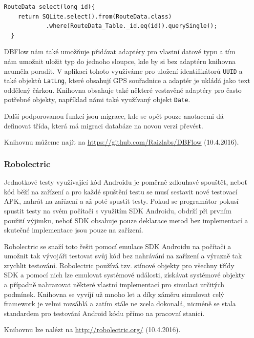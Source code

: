 \documentclass[czech,master,public,dept460,male,java,cpdeclaration]{diploma}
\begin{document}
\begin{lstlisting}[label=dbflowquery,caption=Sestavování SQL dotazů s DBFlow]
  RouteData select(long id){
    return SQLite.select().from(RouteData.class)
            .where(RouteData_Table._id.eq(id)).querySingle();
  }
\end{lstlisting}

  DBFlow nám také umožňuje přidávat adaptéry pro vlastní datové typu a tím nám umožnit uložit
  typ do jednoho sloupce, kde by si bez adaptéru knihovna neuměla poradit. V aplikaci
  tohoto využíváme pro uložení identifikátorů \texttt{UUID} a také objektů \texttt{LatLng},
  které obsahují GPS souřadnice a adaptér je ukládá jako text oddělený čárkou.
  Knihovna obsahuje také některé vestavěné adaptéry pro často potřebné objekty, například námi
  také využívaný objekt \texttt{Date}.

  Další podporovanou funkcí jsou migrace, kde se opět pouze anotacemi dá definovat třída,
  která má migraci databáze na novou verzi převést.

  Knihovnu můžeme najít na \url{https://github.com/Raizlabs/DBFlow} (10.4.2016).


\subsubsection{Robolectric}\label{robolectric}
Jednotkové testy využívající kód Androidu je poměrně zdlouhavé spouštět, neboť kód běží na
zařízení a pro každé spuštění testu se musí sestavit nové testovací APK, nahrát na zařízení
a až poté spustit testy. Pokud se programátor pokusí spustit testy na svém počítači s využitím
SDK Androidu, obdrží při prvním použití výjimku, neboť SDK obsahuje pouze deklarace metod
bez implementací a skutečné implementace jsou pouze na zařízení.

Robolectric se snaží toto řešit pomocí emulace SDK Androidu na počítači a umožnit tak vývojáři
testovat svůj kód bez nahrávání na zařízení a výrazně tak zrychlit testování. Robolectric
používá tzv. stínové objekty pro všechny třídy SDK a pomocí nich lze emulovat systémové události,
získávat systémové objekty a případně nahrazovat některé vlastní implementací pro simulaci
určitých podmínek. Knihovna se vyvíjí už mnoho let a díky záměru simulovat celý framework je velmi
rozsáhlá a zatím stále ne zcela dokonalá, nicméně se stala standardem pro testování Android kódu
přímo na pracovní stanici.

Knihovnu lze nalézt na \url{http://robolectric.org/} (10.4.2016).
\end{document}
